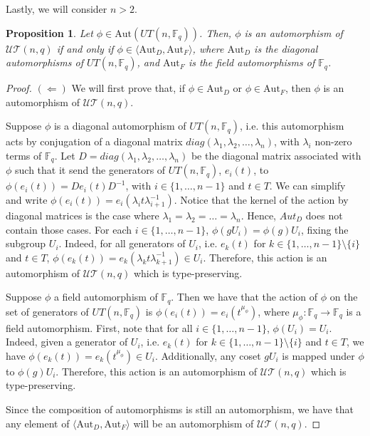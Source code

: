\documentclass[11pt,letterpaper]{amsart}
\newtheorem{proposition}[theorem]{Proposition}
\newcommand{\TT}{\mathcal{T}}
\newcommand{\Aut}{\mathrm{Aut}}
\newcommand{\FF}{\mathbb{F}}
\newcommand{\UU}{\mathcal{U}}
\begin{document}
Lastly, we will consider $n>2$.

\begin{proposition}
    Let $\phi\in \Aut(UT(n,\FF_q))$. Then, $\phi$ is an automorphism of $\UU\TT(n,q)$ if and only if $\phi\in \langle \Aut_D,\Aut_F\rangle$, where
    $\Aut_D$ is the diagonal automorphisms of $UT(n,\FF_q)$, and
$\Aut_F$ is the field automorphisms of $\FF_q$.
\end{proposition}
\begin{proof}
$(\Leftarrow)$
    We will first prove that, if $\phi\in \Aut_D$ or $\phi \in \Aut_F$, then $\phi$ is an automorphism of $\UU\TT(n,q)$.
    
    Suppose $\phi$ is a diagonal automorphism of $UT(n,\FF_q)$, i.e. this automorphism acts by conjugation of a diagonal matrix $diag(\lambda_1,\lambda_2,\ldots,\lambda_n)$, with $\lambda_i$ non-zero terms of $\FF_q$. Let $D = diag(\lambda_1,\lambda_2,\ldots,\lambda_n)$ be the diagonal matrix associated with $\phi$ such that it send the generators of $UT(n,\FF_q)$, $e_i(t)$, to $\phi(e_i(t)) = D e_i(t) D^{-1}$, with $i\in\{1,\ldots, n-1\}$ and $t\in T$. We can simplify and write $\phi(e_{i}(t)) = e_{i}(\lambda_i t \lambda_{i+1}^{-1})$.
    Notice that the kernel of the action by diagonal matrices is the case where $\lambda_1=\lambda_2=\ldots=\lambda_n$. Hence, $Aut_D$ does not contain those cases.
    For each $i\in \{1,\ldots,n-1\}$,  $\phi(gU_{i}) = \phi(g)U_{i}$, fixing the subgroup $U_{i}$. Indeed, for all generators of $U_{i}$, i.e. $e_{k}(t)$ for $k\in \{1,\ldots,n-1\}\setminus\{i\}$ and $t\in T$,
   $\phi(e_{k}(t))= e_{k}(\lambda_k t\lambda_{k+1}^{-1})\in U_{i}$.
    Therefore, this action is an automorphism of $\UU\TT(n,q)$ which is type-preserving.

Suppose $\phi$ a field automorphism of $\FF_q$. Then we have that the action of $\phi$ on the set of generators of $UT(n,\FF_q)$ is  $\phi( e_{i}(t)) = e_{i}(t^{\mu_{\phi}})$, where $\mu_\phi : \FF_q\to \FF_q$ is a field automorphism.
    First, note that for all $i\in \{1,\ldots,n-1\}$, $\phi(U_{i})=U_{i}$. Indeed, given a generator of $U_{i}$, i.e. $e_{k}(t)$ for $k\in \{1,\ldots,n-1\}\setminus\{i\}$ and $t\in T$, we have
   $\phi(e_{k}(t)) = e_{k}(t^{\mu_\phi})\in U_{i}$.
    Additionally, any coset $gU_{i}$ is mapped under $\phi$ to $\phi(g)U_{i}$. Therefore, this action is an automorphism of $\UU\TT(n,q)$ which is type-preserving.

    Since the composition of automorphisms is still an automorphism, we have that any element of $\langle \Aut_D,\Aut_F\rangle$ will be an automorphism of $\UU\TT(n,q)$.


\end{proof}
\end{document}

